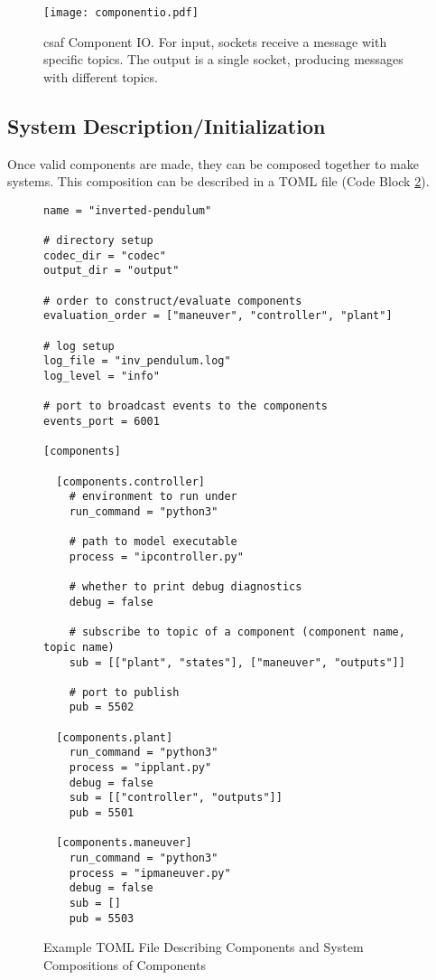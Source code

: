 \begin{figure}
\centering
\texttt{[image: componentio.pdf]}
\caption{\acrshort{csaf}  Component IO. For input, sockets receive a message with specific topics. The output is a single socket, producing messages with different topics.}
\label{fig:cio}
\end{figure}

\subsection{System Description/Initialization}

Once valid components are made, they can be composed together to make systems. This composition can be described in a TOML file (Code Block \ref{fig:sysset}). 

\begin{figure}
\begin{lstlisting}
name = "inverted-pendulum"

# directory setup
codec_dir = "codec"
output_dir = "output"

# order to construct/evaluate components 
evaluation_order = ["maneuver", "controller", "plant"]

# log setup
log_file = "inv_pendulum.log"
log_level = "info"

# port to broadcast events to the components
events_port = 6001

[components]

  [components.controller]
    # environment to run under
    run_command = "python3"

    # path to model executable
    process = "ipcontroller.py"

    # whether to print debug diagnostics
    debug = false

    # subscribe to topic of a component (component name, topic name)
    sub = [["plant", "states"], ["maneuver", "outputs"]]

    # port to publish
    pub = 5502

  [components.plant]
    run_command = "python3"
    process = "ipplant.py"
    debug = false
    sub = [["controller", "outputs"]]
    pub = 5501

  [components.maneuver]
    run_command = "python3"
    process = "ipmaneuver.py"
    debug = false
    sub = []
    pub = 5503
\end{lstlisting}
\caption{Example TOML File Describing Components and System Compositions of Components}
\label{fig:sysset}
\end{figure}

